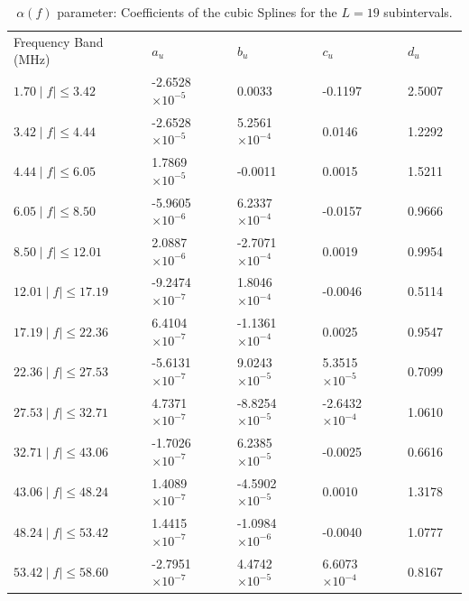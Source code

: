 \documentclass[journal]{IEEEtran}
\begin{document}
\begin{table}[h]
	\setlength\extrarowheight{4.5pt}
	\centering
	\vspace*{-5mm}
	\caption{$\alpha(f)$ parameter: Coefficients of the cubic Splines for the $L=19$ subintervals.}
	\label{table_alfa}
	\begin{tabular}{|C{3.5cm}|C{2.5cm}|C{2.5cm}|C{2.5cm}|C{2.5cm}|m{0cm}}
		Frequency Band (MHz)           		   & $a_u$    			  & $b_u$      			 & $c_u$   		 		& $d_u$&\\ 
		$1.70 \mid f\mid \leq 3.42$   & -2.6528 $\times 10^{-5}$ & 0.0033  				 & -0.1197 					& 2.5007 &\\ 
		$3.42 \mid f\mid \leq 4.44$   & -2.6528 $\times 10^{-5}$ & 5.2561 $\times 10^{-4}$  & 0.0146  					& 1.2292 &\\ 
		$4.44 \mid f\mid \leq 6.05$   & 1.7869  $\times 10^{-5}$ & -0.0011                  & 0.0015                   & 1.5211 &\\ 
		$6.05 \mid f\mid \leq 8.50$   & -5.9605 $\times 10^{-6}$ & 6.2337 $\times 10^{-4}$  & -0.0157                  & 0.9666 &\\ 
		$8.50 \mid f\mid \leq 12.01$  & 2.0887  $\times 10^{-6}$ & -2.7071 $\times 10^{-4}$ & 0.0019 					& 0.9954 &\\ 
		$12.01 \mid f\mid \leq 17.19$ & -9.2474 $\times 10^{-7}$ & 1.8046 $\times 10^{-4}$  & -0.0046 					& 0.5114 &\\ 
		$17.19 \mid f\mid \leq 22.36$ & 6.4104  $\times 10^{-7}$ & -1.1361 $\times 10^{-4}$ & 0.0025  					& 0.9547 &\\ 
		$22.36 \mid f\mid \leq 27.53$ & -5.6131 $\times 10^{-7}$ & 9.0243 $\times 10^{-5}$  & 5.3515 $\times 10^{-5}$  & 0.7099 &\\ 
		$27.53 \mid f\mid \leq 32.71$ & 4.7371  $\times 10^{-7}$ & -8.8254 $\times 10^{-5}$ & -2.6432 $\times 10^{-4}$ & 1.0610 &\\ 
		$32.71 \mid f\mid \leq 43.06$ & -1.7026 $\times 10^{-7}$ & 6.2385 $\times 10^{-5}$  & -0.0025 					& 0.6616 &\\ 
		$43.06 \mid f\mid \leq 48.24$ & 1.4089  $\times 10^{-7}$ & -4.5902 $\times 10^{-5}$ & 0.0010  					& 1.3178 &\\ 
		$48.24 \mid f\mid \leq 53.42$ & 1.4415  $\times 10^{-7}$ & -1.0984 $\times 10^{-6}$ & -0.0040 					& 1.0777 &\\ 
		$53.42 \mid f\mid \leq 58.60$ & -2.7951 $\times 10^{-7}$ & 4.4742 $\times 10^{-5}$  & 6.6073 $\times 10^{-4}$  & 0.8167 &\\ 

\end{tabular}
\end{table}
\end{document}
